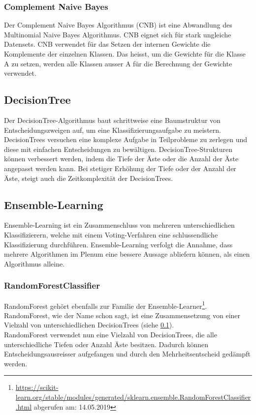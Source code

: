 \subsubsection{Complement Naive Bayes}
Der Complement Naive Bayes Algorithmus (CNB) ist eine Abwandlung des Multinomial Naive Bayes Algorithmus.
CNB eignet sich für stark ungleiche Datensets.
CNB verwendet für das Setzen der internen Gewichte die Komplemente der einzelnen Klassen.
Das heisst, um die Gewichte für die Klasse A zu setzen, werden alle Klassen ausser A für die Berechnung der Gewichte verwendet\cite{rennie2003tackling}.
\subsection{DecisionTree}\label{sec:trees}
Der DecisionTree-Algorithmus baut schrittweise eine Baumstruktur von Entscheidungszweigen auf, um eine Klassifizierungsaufgabe zu meistern.
DecisionTrees versuchen eine komplexe Aufgabe in Teilprobleme zu zerlegen und diese mit einfachen Entscheidungen zu bewältigen.
DecisionTree-Strukturen können verbessert werden, indem die Tiefe der Äste oder die Anzahl der Äste angepasst werden kann.
Bei stetiger Erhöhung der Tiefe oder der Anzahl der Äste, steigt auch die Zeitkomplexität der DecisionTrees\cite{safavian1991survey}.
\subsection{Ensemble-Learning}
Ensemble-Learning ist ein Zusammenschluss von mehreren unterschiedlichen Klassifizierern, welche mit einem Voting-Verfahren eine schlussendliche Klassifizierung durchführen.
Ensemble-Learning verfolgt die Annahme, dass mehrere Algorithmen im Plenum eine bessere Aussage abliefern können, als einen Algorithmus alleine\cite{freund1999short}.
\subsubsection{RandomForestClassifier}
RandomForest gehört ebenfalls zur Familie der Ensemble-Learner\footnote{\url{https://scikit-learn.org/stable/modules/generated/sklearn.ensemble.RandomForestClassifier.html} abgerufen am: 14.05.2019}.
RandomForest, wie der Name schon sagt, ist eine Zusammensetzung von einer Vielzahl von unterschiedlichen DecisionTrees (siehe \cref{sec:trees}).\\
RandomForest verwendet nun eine Vielzahl von DecisionTrees, die alle unterschiedliche Tiefen oder Anzahl Äste besitzen.
Dadurch können Entscheidungsausreisser aufgefangen und durch den Mehrheitsentscheid gedämpft werden\cite{liaw2002classification}.
